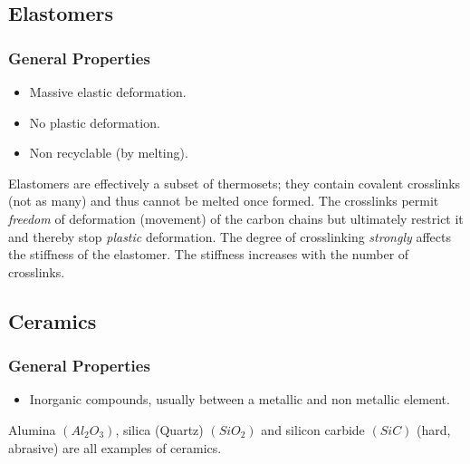 \documentclass[class=report, crop=false, 12pt,a4paper]{standalone}
\begin{document}
\subsection{Elastomers}
\subsubsection{General Properties}
\begin{itemize}[noitemsep]
  \item Massive elastic deformation.
  \item No plastic deformation.
  \item Non recyclable (by melting).
\end{itemize}

Elastomers are effectively a subset of thermosets; they contain covalent crosslinks (not as many) and thus cannot be melted once formed. The crosslinks permit \emph{freedom} of deformation (movement) of the carbon chains but ultimately restrict it and thereby stop \emph{plastic} deformation. The degree of crosslinking \emph{strongly} affects the stiffness of the elastomer. The stiffness increases with the number of crosslinks. 

\subsection{Ceramics}
\subsubsection{General Properties}
\begin{itemize}[noitemsep]
  \item Inorganic compounds, usually between a metallic and non metallic element.
\end{itemize}

Alumina \((Al_2O_3)\), silica (Quartz) \((SiO_2)\) and silicon carbide \((SiC)\) (hard, abrasive) are all examples of ceramics. 
\end{document}
